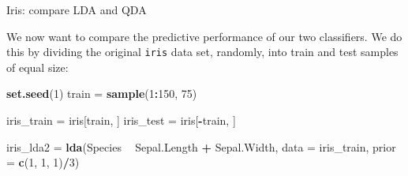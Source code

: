 \documentclass[10pt,ignorenonframetext,]{beamer}
\newenvironment{Shaded}{\begin{snugshade}}{\end{snugshade}}
\newcommand{\KeywordTok}[1]{\textcolor[rgb]{0.13,0.29,0.53}{\textbf{#1}}}
\newcommand{\DataTypeTok}[1]{\textcolor[rgb]{0.13,0.29,0.53}{#1}}
\newcommand{\DecValTok}[1]{\textcolor[rgb]{0.00,0.00,0.81}{#1}}
\newcommand{\StringTok}[1]{\textcolor[rgb]{0.31,0.60,0.02}{#1}}
\newcommand{\OperatorTok}[1]{\textcolor[rgb]{0.81,0.36,0.00}{\textbf{#1}}}
\newcommand{\NormalTok}[1]{#1}
\begin{document}
\begin{frame}[fragile]

\begin{block}{Iris: compare LDA and QDA}

We now want to compare the predictive performance of our two
classifiers. We do this by dividing the original \texttt{iris} data set,
randomly, into train and test samples of equal size:

\begin{Shaded}
\begin{Highlighting}[]
\KeywordTok{set.seed}\NormalTok{(}\DecValTok{1}\NormalTok{)}
\NormalTok{train =}\StringTok{ }\KeywordTok{sample}\NormalTok{(}\DecValTok{1}\OperatorTok{:}\DecValTok{150}\NormalTok{, }\DecValTok{75}\NormalTok{)}

\NormalTok{iris_train =}\StringTok{ }\NormalTok{iris[train, ]}
\NormalTok{iris_test =}\StringTok{ }\NormalTok{iris[}\OperatorTok{-}\NormalTok{train, ]}

\NormalTok{iris_lda2 =}\StringTok{ }\KeywordTok{lda}\NormalTok{(Species }\OperatorTok{~}\StringTok{ }\NormalTok{Sepal.Length }\OperatorTok{+}\StringTok{ }\NormalTok{Sepal.Width, }\DataTypeTok{data =}\NormalTok{ iris_train, }
    \DataTypeTok{prior =} \KeywordTok{c}\NormalTok{(}\DecValTok{1}\NormalTok{, }\DecValTok{1}\NormalTok{, }\DecValTok{1}\NormalTok{)}\OperatorTok{/}\DecValTok{3}\NormalTok{)}
\end{Highlighting}
\end{Shaded}

\end{block}

\end{frame}
\end{document}
